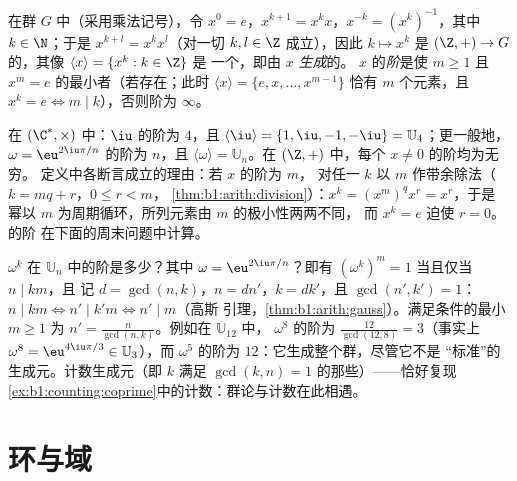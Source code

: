 \begin{definition}[幂，元素的阶]\label{def:b1:structures:order}
在群 $G$ 中（采用乘法记号），令 $x^0 = e$，$x^{k+1} =
x^k x$，$x^{-k} = (x^k)^{-1}$，其中 $k \in \N$；于是 $x^{k+l} = x^k
x^l$（对一切 $k, l \in \Z$ 成立），因此 $k \mapsto x^k$ 是 $(\Z,
+) \to G$ 的，其像 $\langle x \rangle = \{x^k : k \in \Z\}$ 是
一个，即由 $x$ \emph{生成}的。
$x$ 的\emph{阶}是使 $m \geq
1$ 且 $x^m = e$ 的最小者（若存在；此时 $\langle x\rangle = \{e, x,
\dots, x^{m-1}\}$ 恰有 $m$ 个元素，且 $x^k = e \iff m
\mid k$），否则阶为 $\infty$。
\end{definition}

\begin{example}\label{ex:b1:structures:order}
在 $(\C^*, \times)$ 中：$\iu$ 的阶为 $4$，且 $\langle \iu \rangle
= \{1, \iu, -1, -\iu\} = \mathbb{U}_4$；更一般地，$\omega =
\eu^{2\iu\pi/n}$ 的阶为 $n$，且 $\langle\omega\rangle =
\mathbb{U}_n$。在 $(\Z, +)$ 中，每个 $x \neq 0$ 的阶均为无穷。
定义中各断言成立的理由：若 $x$ 的阶为 $m$，
对任一 $k$ 以 $m$ 作带余除法（$k = mq + r$，$0 \leq r < m$，
\cref{thm:b1:arith:division}）：$x^k = (x^m)^q x^r = x^r$，于是
幂以 $m$ 为周期循环，所列元素由 $m$ 的极小性两两不同，
而 $x^k = e$ 迫使 $r = 0$。的阶
在下面的周末问题中计算。
\end{example}

\begin{example}\label{ex:b1:structures:orderU12}
$\omega^k$ 在 $\mathbb U_n$ 中的阶是多少？其中 $\omega =
\eu^{2\iu\pi/n}$？即有 $(\omega^k)^m = 1$ 当且仅当 $n \mid km$，且
记 $d = \gcd(n, k)$，$n = dn'$，$k = dk'$，且 $\gcd(n', k')
= 1$：$n \mid km \iff n' \mid k'm \iff n' \mid m$（高斯
引理，\cref{thm:b1:arith:gauss}）。满足条件的最小 $m \geq 1$ 为
$n' = \frac{n}{\gcd(n,k)}$。例如在 $\mathbb U_{12}$ 中，
$\omega^8$ 的阶为 $\frac{12}{\gcd(12,8)} = 3$（事实上
$\omega^8 = \eu^{4\iu\pi/3} \in \mathbb U_3$），而 $\omega^5$
的阶为 $12$：它生成整个群，尽管它不是
“标准”的生成元。计数生成元（即 $k$
满足 $\gcd(k, n) = 1$ 的那些）——恰好复现
\cref{ex:b1:counting:coprime}中的计数：群论与计数在此相遇。
\end{example}

\section{环与域}

